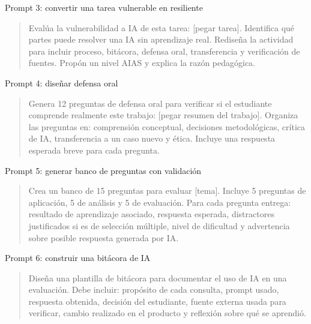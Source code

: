 \documentclass[
  ignorenonframetext,
  aspectratio=169,
  spanish,
]{beamer}
\begin{document}
\begin{frame}{Prompt 3: convertir una tarea vulnerable en resiliente}
\protect{}\label{prompt-3-convertir-una-tarea-vulnerable-en-resiliente}
\begin{quote}
Evalúa la vulnerabilidad a IA de esta tarea: {[}pegar tarea{]}.
Identifica qué partes puede resolver una IA sin aprendizaje real.
Rediseña la actividad para incluir proceso, bitácora, defensa oral,
transferencia y verificación de fuentes. Propón un nivel AIAS y explica
la razón pedagógica.
\end{quote}
\end{frame}

\begin{frame}{Prompt 4: diseñar defensa oral}
\protect{}\label{prompt-4-diseuxf1ar-defensa-oral}
\begin{quote}
Genera 12 preguntas de defensa oral para verificar si el estudiante
comprende realmente este trabajo: {[}pegar resumen del trabajo{]}.
Organiza las preguntas en: comprensión conceptual, decisiones
metodológicas, crítica de IA, transferencia a un caso nuevo y ética.
Incluye una respuesta esperada breve para cada pregunta.
\end{quote}
\end{frame}

\begin{frame}{Prompt 5: generar banco de preguntas con validación}
\protect{}\label{prompt-5-generar-banco-de-preguntas-con-validaciuxf3n}
\begin{quote}
Crea un banco de 15 preguntas para evaluar {[}tema{]}. Incluye 5
preguntas de aplicación, 5 de análisis y 5 de evaluación. Para cada
pregunta entrega: resultado de aprendizaje asociado, respuesta esperada,
distractores justificados si es de selección múltiple, nivel de
dificultad y advertencia sobre posible respuesta generada por IA.
\end{quote}
\end{frame}

\begin{frame}{Prompt 6: construir una bitácora de IA}
\protect{}\label{prompt-6-construir-una-bituxe1cora-de-ia}
\begin{quote}
Diseña una plantilla de bitácora para documentar el uso de IA en una
evaluación. Debe incluir: propósito de cada consulta, prompt usado,
respuesta obtenida, decisión del estudiante, fuente externa usada para
verificar, cambio realizado en el producto y reflexión sobre qué se
aprendió.
\end{quote}
\end{frame}
\end{document}
